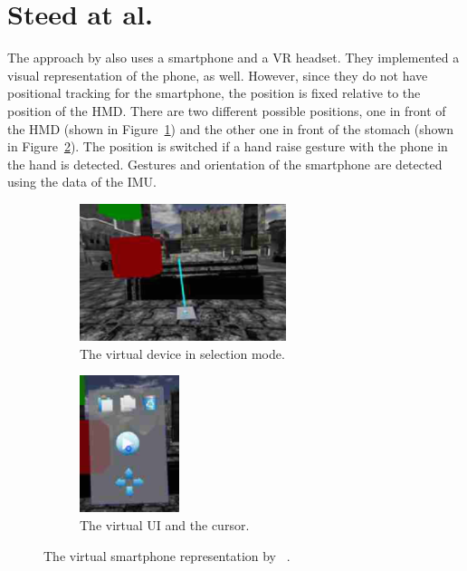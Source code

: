 \section{Steed at al.}\label{section:steed-2013}
The approach by \citeauthor{Steed.2013} also uses a smartphone and a \ac{VR} headset. They implemented a visual representation of the phone, as well. However, since they do not have positional tracking for the smartphone, the position is fixed relative to the position of the \ac{HMD}. There are two different possible positions, one in front of the \ac{HMD} (shown in Figure~\ref{fig:steed-2013-laser-pointer}) and the other one in front of the stomach (shown in Figure~\ref{fig:steed-2013-ui}). The position is switched if a hand raise gesture with the phone in the hand is detected. Gestures and orientation of the smartphone are detected using the data of the \ac{IMU}. 

\begin{figure}[H]
 \centering
 \begin{subfigure}{0.45\textwidth}%
 \centering%
 \includegraphics[height=4cm]{figures/related_work/steed_2013_laser_pointer.png}
 \caption{The virtual device in selection mode.}\label{fig:steed-2013-laser-pointer}%
 \end{subfigure}%
 \hspace{0.1\textwidth}%
 \begin{subfigure}{0.45\textwidth}%
 \centering%
 \includegraphics[height=4cm]{figures/related_work/steed_2013_ui.png}
 \caption{The virtual \ac{UI} and the cursor.}\label{fig:steed-2013-ui}
 \end{subfigure}%
 \caption[Virtual smartphone representation by Steep et al.]{The virtual smartphone representation by \citeauthor{Steed.2013}~\protect\cite[43]{Steed.2013}.}\label{fig:steed-2013}
\end{figure}

